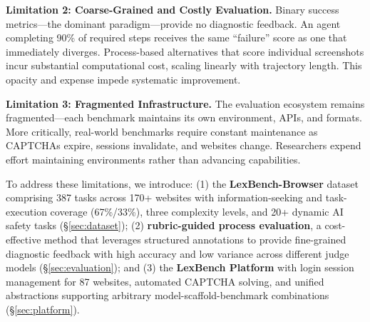 \textbf{Limitation 2: Coarse-Grained and Costly Evaluation.} Binary success metrics---the dominant paradigm---provide no diagnostic feedback. An agent completing 90\% of required steps receives the same ``failure'' score as one that immediately diverges. Process-based alternatives that score individual screenshots incur substantial computational cost, scaling linearly with trajectory length. This opacity and expense impede systematic improvement.

\textbf{Limitation 3: Fragmented Infrastructure.} The evaluation ecosystem remains fragmented---each benchmark maintains its own environment, APIs, and formats. More critically, real-world benchmarks require constant maintenance as CAPTCHAs expire, sessions invalidate, and websites change. Researchers expend effort maintaining environments rather than advancing capabilities.

To address these limitations, we introduce: (1) the \textbf{LexBench-Browser} dataset comprising 387 tasks across 170+ websites with information-seeking and task-execution coverage (67\%/33\%), three complexity levels, and 20+ dynamic AI safety tasks (\S\ref{sec:dataset}); (2) \textbf{rubric-guided process evaluation}, a cost-effective method that leverages structured annotations to provide fine-grained diagnostic feedback with high accuracy and low variance across different judge models (\S\ref{sec:evaluation}); and (3) the \textbf{LexBench Platform} with login session management for 87 websites, automated CAPTCHA solving, and unified abstractions supporting arbitrary model-scaffold-benchmark combinations (\S\ref{sec:platform}).



